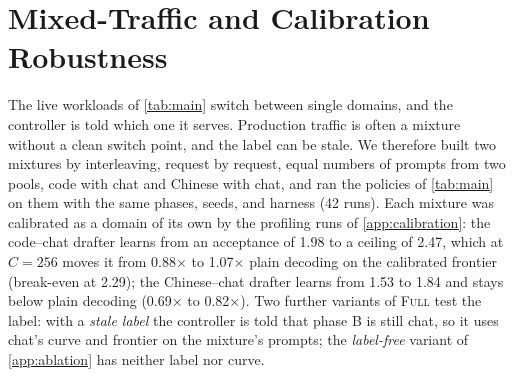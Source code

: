 \documentclass{article}
\newcommand{\pol}[1]{\textsc{#1}}
\begin{document}
\FloatBarrier
\section{Mixed-Traffic and Calibration Robustness}\label{app:mix}

The live workloads of \cref{tab:main} switch between single domains, and the controller is told which one it serves. Production traffic is often a mixture without a clean switch point, and the label can be stale. We therefore built two mixtures by interleaving, request by request, equal numbers of prompts from two pools, code with chat and Chinese with chat, and ran the policies of \cref{tab:main} on them with the same phases, seeds, and harness (42 runs). Each mixture was calibrated as a domain of its own by the profiling runs of \cref{app:calibration}: the code--chat drafter learns from an acceptance of 1.98 to a ceiling of 2.47, which at $C{=}256$ moves it from 0.88$\times$ to 1.07$\times$ plain decoding on the calibrated frontier (break-even at 2.29); the Chinese--chat drafter learns from 1.53 to 1.84 and stays below plain decoding (0.69$\times$ to 0.82$\times$). Two further variants of \pol{Full} test the label: with a \emph{stale label} the controller is told that phase B is still chat, so it uses chat's curve and frontier on the mixture's prompts; the \emph{label-free} variant of \cref{app:ablation} has neither label nor curve.
\end{document}

